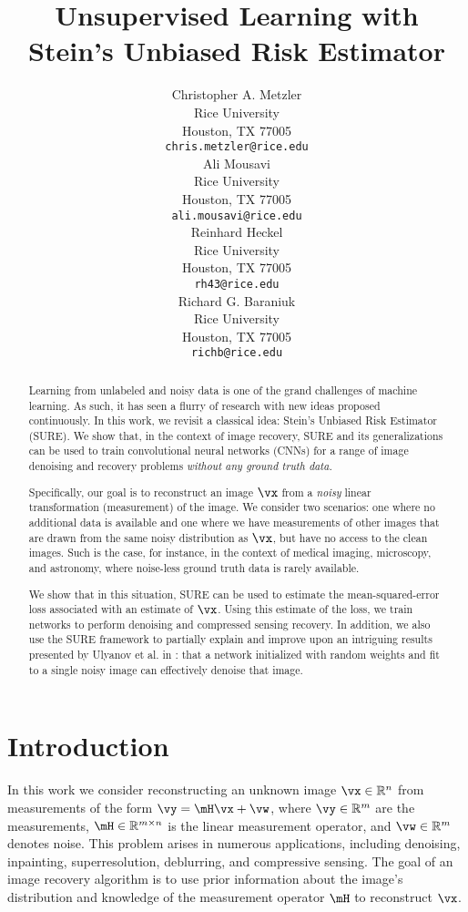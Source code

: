 \documentclass{article}
\title{Unsupervised Learning with \\ Stein's Unbiased Risk Estimator}
\author{
  Christopher A. Metzler\\
  Rice University\\
  Houston, TX 77005 \\
  \texttt{chris.metzler@rice.edu} \\
  \And
  Ali Mousavi\\
  Rice University\\
  Houston, TX 77005 \\
  \texttt{ali.mousavi@rice.edu} \\
  \And
  Reinhard Heckel\\
  Rice University\\
  Houston, TX 77005 \\
  \texttt{rh43@rice.edu} \\
  \And
  Richard G. Baraniuk\\
  Rice University\\
  Houston, TX 77005 \\
  \texttt{richb@rice.edu} \\
}
\newcommand\img{\vx}
\newcommand\obs{\vy}
\newcommand\noise{\vw}
\begin{document}

\maketitle

\begin{abstract}
Learning from unlabeled and noisy data is one of the grand challenges of machine learning. 
As such, it has seen a flurry of research with new ideas proposed continuously. 
In this work, we revisit a classical idea: Stein's Unbiased Risk Estimator (SURE). 
We show that, in the context of image recovery, SURE and its generalizations can be used to train convolutional neural networks (CNNs) for a range of image denoising and recovery problems {\em without any ground truth data.}

Specifically, our goal is to  reconstruct an image $\img$ from a \emph{noisy} linear transformation (measurement) of the image.
We consider two scenarios: one where no additional data is available and one where we have measurements of other images that are drawn from the same noisy distribution as $\img$, but have no access to the clean images. 
Such is the case, for instance, in the context of medical imaging, microscopy, and astronomy, where noise-less ground truth data is rarely available.

We show that in this situation, SURE can be used to estimate the mean-squared-error loss associated with an estimate of $\img$. 
Using this estimate of the loss, we train networks to perform denoising and compressed sensing recovery. 
In addition, we also use the SURE framework to partially explain and improve upon an intriguing results presented by Ulyanov et al. in \cite{DeepImagePrior}: that a network initialized with random weights and fit to a single noisy image can effectively denoise that image.

\end{abstract}

\section{Introduction}%
In this work we consider reconstructing an unknown image $\img \in\mathbb{R}^n$ from measurements of the form $\obs = \mH \img + \noise$, where $\obs\in\mathbb{R}^m$ are the measurements, $\mH\in\mathbb{R}^{m\times n}$ is the linear measurement operator, and $\noise \in\mathbb{R}^m$ denotes noise.
This problem arises in numerous applications, including denoising, inpainting, superresolution, deblurring, and compressive sensing.
The goal of an image recovery algorithm is to use prior information about the image's distribution and knowledge of the measurement operator $\mH$ to reconstruct $\img$.
\end{document}
